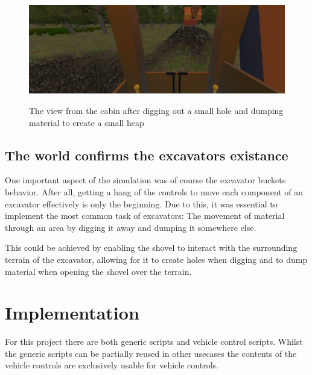 \documentclass[journal]{vgtc}                     %
\begin{document}
\begin{figure}[tb]%
  \centering %
  \includegraphics[width=\columnwidth, alt={The view from the cabin of a excavator. On one side there is a smaller hole, next to it lies a small heap of material, suggesting the excavator dug it out. the shovel is placed neatly on top of the heap}]{GroundDeformation}
  \caption{%
  	The view from the cabin after digging out a small hole and dumping material to create a small heap%
  }
  \label{fig:cabin_view}
\end{figure}

\subsection{The world confirms the excavators existance}

One important aspect of the simulation was of course the excavator buckets behavior. After all, getting a hang of the controls to move each component of an excavator effectively is only the beginning. Due to this, it was essential to implement the most common task of excavators: The movement of material through an area by digging it away and dumping it somewhere else.

This could be achieved by enabling the shovel to interact with the surrounding terrain of the excavator, allowing for it to create holes when digging and to dump material when opening the shovel over the terrain.


\section{Implementation}
For this project there are both generic scripts and vehicle control scripts. Whilst the generic scripts can be partially reused in other usecases the contents of the vehicle controls are exclusively usable for vehicle controls.
\end{document}
